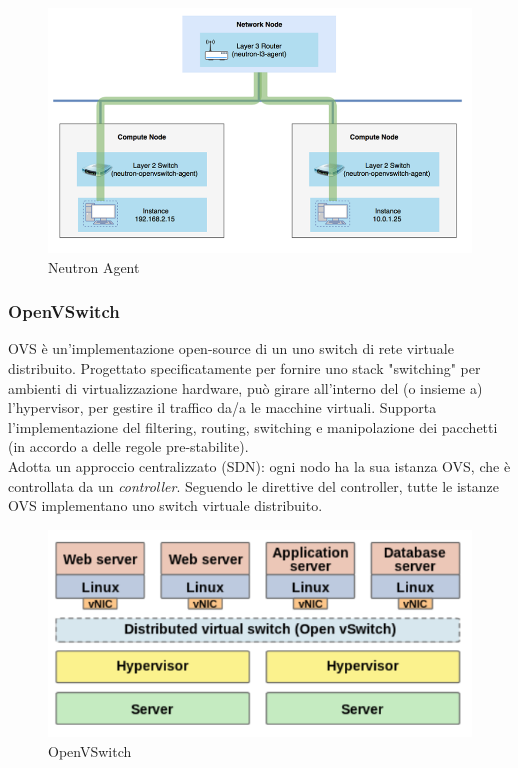 \documentclass{article}
\begin{document}
\begin{figure}[H]
    \centering
    \includegraphics[scale=0.5]{img/neutron agent.png}
    \caption{Neutron Agent}
\end{figure}\noindent

\subsubsection{OpenVSwitch}
OVS è un'implementazione open-source di un uno switch di rete virtuale distribuito. Progettato specificatamente per fornire uno stack "switching" per ambienti di virtualizzazione hardware, può girare all'interno del (o insieme a) l'hypervisor, per gestire il traffico da/a le macchine virtuali. Supporta l'implementazione del filtering, routing, switching e manipolazione dei pacchetti (in accordo a delle regole pre-stabilite). \\
Adotta un approccio centralizzato (SDN): ogni nodo ha la sua istanza OVS, che è controllata da un \textit{controller}. Seguendo le direttive del controller, tutte le istanze OVS implementano uno switch virtuale distribuito.
\begin{figure}[H]
    \centering
    \includegraphics[scale=0.5]{img/openvswitch.png}
    \caption{OpenVSwitch}
\end{figure}\noindent
\end{document}
